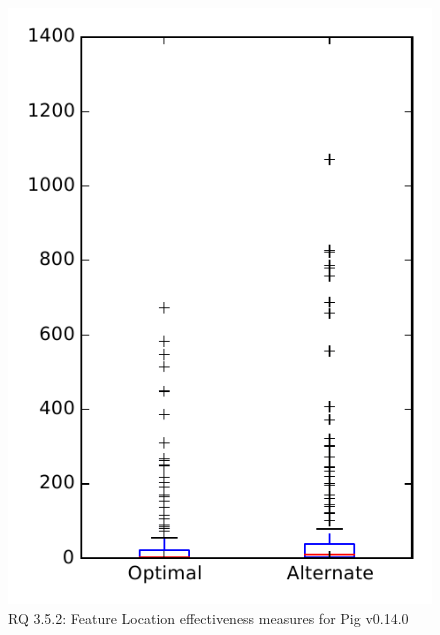 
\begin{figure}
\centering
\includegraphics[height=0.4\textheight]{figures/combo/flt_rq2_pig}
\caption{RQ 3.5.2: Feature Location effectiveness measures for Pig v0.14.0}
\label{fig:flt:rq2:pig}
\end{figure}
